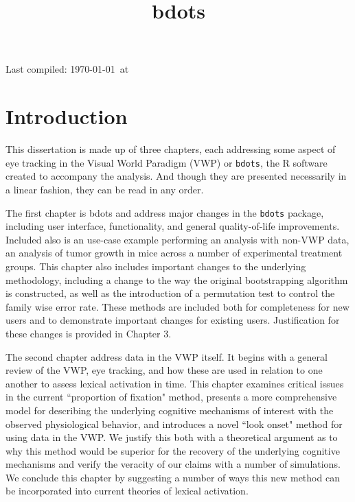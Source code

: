 \documentclass{article}
\title{bdots}
\date{}
\newcommand{\xt}{\texttt}%
\begin{document}


Last compiled: \today \  at \currenttime

%

\section{Introduction}

This dissertation is made up of three chapters, each addressing some aspect of eye tracking in the Visual World Paradigm (VWP) or \xt{bdots}, the R software created to accompany the analysis. And though they are presented necessarily in a linear fashion, they can be read in any order.

The first chapter is bdots and address major changes in the \xt{bdots} package, including user interface, functionality, and general quality-of-life improvements. Included also is an use-case example performing an analysis with non-VWP data, an analysis of tumor growth in mice across a number of experimental treatment groups. This chapter also includes important changes to the underlying methodology, including a change to the way the original bootstrapping algorithm is constructed, as well as the introduction of a permutation test to control the family wise error rate. These methods are included both for completeness for new users and to demonstrate important changes for existing users. Justification for these changes is provided in Chapter 3. 

The second chapter address data in the VWP itself. It begins with a general review of the VWP, eye tracking, and how these are used in relation to one another to assess lexical activation in time. This chapter examines critical issues in the current ``proportion of fixation" method, presents a more comprehensive model for describing the underlying cognitive mechanisms of interest with the observed physiological behavior, and introduces a novel ``look onset" method for using data in the VWP. We justify this both with a theoretical argument as to why this method would be superior for the recovery of the underlying cognitive mechanisms and verify the veracity of our claims with a number of simulations. We conclude this chapter by suggesting a number of ways this new method can be incorporated into current theories of lexical activation.
\end{document}
